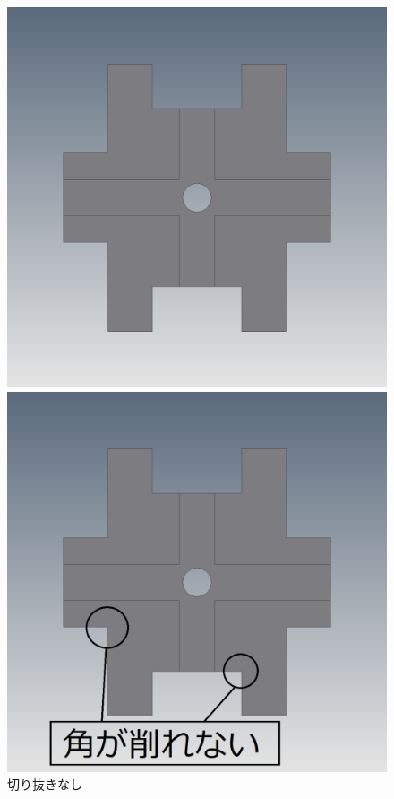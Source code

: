 \documentclass[b5paper, 9pt, twocolumn, titlepage,openany]{jsbook}%
\begin{document}
\begin{figure}[tbh]
  \begin{center}
    \begin{minipage}{0.4\columnwidth}
      \includegraphics[width=\columnwidth]{piece_1_ue5.png}
    \end{minipage}
    \hspace{0.05\columnwidth}
    \begin{minipage}{0.4\columnwidth}
      \includegraphics[width=\columnwidth]{piece_1_ue4.png}
    \end{minipage}
    \caption{切り抜きなし    \label{no_kirinuki}}
  \end{center}
\end{figure}
\end{document}
